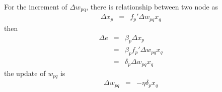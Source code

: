\documentclass{article}
\newcommand{\tmop}[1]{\ensuremath{\operatorname{#1}}}
\begin{document}
For the increment of $\Delta w_{\tmop{pq}}$, there is relationship between two
node as
\begin{eqnarray*}
  \Delta x_p & = & f_p' \Delta w_{p q} x_q
\end{eqnarray*}
then
\begin{eqnarray*}
  \Delta e & = & \beta_p \Delta x_p\\
  & = & \beta_p f_p' \Delta w_{p q} x_q\\
  & = & \delta_p \Delta w_{p q} x_q
\end{eqnarray*}
the update of $w_{p q}$ is
\begin{eqnarray*}
  \Delta w_{p q} & = & - \eta \delta_p x_q
\end{eqnarray*}


\
\end{document}

